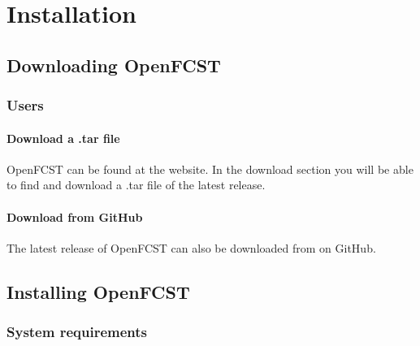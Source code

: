 \chapter{Installation}

\section{Downloading OpenFCST}

\subsection{Users}

\subsubsection{Download a .tar file}
OpenFCST can be found at the   website. In the download section you will be able to find and download a .tar file of the latest release. 

\subsubsection{Download from GitHub}
The latest release of OpenFCST can also be downloaded from  on GitHub.


\section{Installing OpenFCST} \label{installing_fcst}

\subsection{System requirements}

